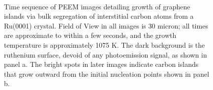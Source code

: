 \begin{figure}
{  }
  \\
  \hfill
  \caption{Time sequence of PEEM images detailing growth of graphene islands via bulk segregation of interstitial carbon atoms from a Ru(0001) crystal. Field of View in all images is 30 micron; all times are approximate to within a few seconds, and the growth temperature is approximately 1075 K. The dark background is the ruthenium surface, devoid of any photoemission signal, as shown in panel a. The bright spots in later images indicate carbon islands that grow outward from the initial nucleation points shown in panel b.
  }
  \label{fig:seg-growth}
  \end{figure}

